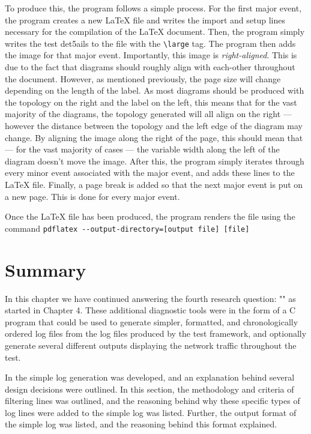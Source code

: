 To produce this, the program follows a simple process.
For the first major event, the program creates a new LaTeX file and writes the import and setup lines necessary for the compilation of the LaTeX document.
Then, the program simply writes the test det5ails to the file with the \verb|\large| tag.
The program then adds the image for that major event. Importantly, this image is \emph{right-aligned}. 
This is due to the fact that diagrams should roughly align with each-other throughout the document.
However, as mentioned previously, the page size will change depending on the length of the label.
As most diagrams should be produced with the topology on the right and the label on the left, this means that for the vast majority of the diagrams, the topology generated will all align on the right — however the distance between the topology and the left edge of the diagram may change.
By aligning the image along the right of the page, this should mean that — for the vast majority of cases — the variable width along the left of the diagram doesn't move the image.
After this, the program simply iterates through every minor event associated with the major event, and adds these lines to the LaTeX file.
Finally, a page break is added so that the next major event is put on a new page.
This is done for every major event.

Once the LaTeX file has been produced, the program renders the file using the command
\verb|pdflatex --output-directory=[output file] [file]|


\section{Summary}

In this chapter we have continued answering the fourth research question: "\fourthRQ" as started in Chapter 4.
These additional diagnostic tools were in the form of a C program that could be used to generate simpler, formatted, and chronologically ordered log files from the log files produced by the test framework, and optionally generate several different outputs displaying the network traffic throughout the test.

In  the simple log generation was developed, and an explanation behind several design decisions were outlined.
In this section, the methodology and criteria of filtering lines was outlined, and the reasoning behind why these specific types of log lines were added to the simple log was listed.
Further, the output format of the simple log was listed, and the reasoning behind this format explained.

